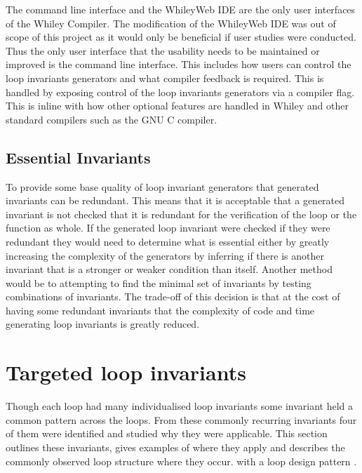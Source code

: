 The command line interface and the WhileyWeb IDE are the only user interfaces
of the Whiley Compiler.
The modification of the WhileyWeb IDE was out of scope of this project as it
would only be beneficial if user studies were conducted.
Thus the only user interface that the usability needs to be maintained or
improved is the command line interface.
This includes how users can control the loop invariants generators and what
compiler feedback is required.
This is handled by exposing control of the loop invariants generators via
a compiler flag.
This is inline with how other optional features are handled in Whiley and
other standard compilers such as the GNU C compiler.

\subsection{Essential Invariants}\label{s:essential-inv}

To provide some base quality of loop invariant generators that generated invariants 
can be redundant.
This means that it is acceptable that a generated invariant is not
checked that it is redundant for the verification of the loop or the function
as whole.
If the generated loop invariant were checked if they were redundant
they would need to determine what is essential either by greatly increasing
the complexity of the generators by inferring if there is another invariant
that is a stronger or weaker condition than itself.
Another method would be to attempting to find the
minimal set of invariants by testing combinations of invariants.
The trade-off of this decision is that at the cost of having some redundant
invariants that the complexity of code and time generating loop invariants is
greatly reduced.

\section{Targeted loop invariants}

Though each loop had many individualised loop invariants some invariant held a
common pattern across the loops.
From these commonly recurring invariants four of them were identified and
studied why they were applicable.
This section outlines these invariants, gives examples of where they apply and
describes the commonly observed loop structure where they occur.
with a loop design pattern \cite{pattern-lang}.

